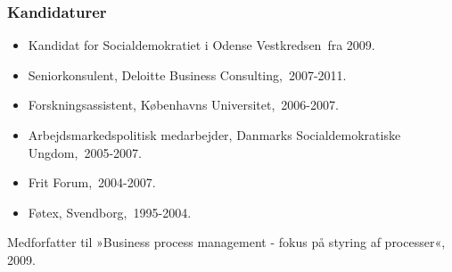 \documentclass[11pt, a4paper]{awesome-cv}
\begin{document}
\begin{cvletter}
\subsubsection*{Kandidaturer}
\begin{itemize}
\item Kandidat for Socialdemokratiet i Odense Vestkredsen fra 2009.
\end{itemize}
\begin{itemize}
\item Seniorkonsulent, Deloitte Business Consulting, 2007-2011.
\item Forskningsassistent, Københavns Universitet, 2006-2007.
\item Arbejdsmarkedspolitisk medarbejder, Danmarks Socialdemokratiske Ungdom, 2005-2007.
\item Frit Forum, 2004-2007.
\item Føtex, Svendborg, 1995-2004.
\end{itemize}
Medforfatter til »Business process management - fokus på styring af processer«, 2009.

\end{cvletter}
\end{document}
